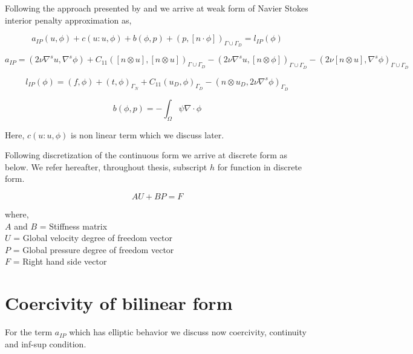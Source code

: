 \documentclass[a4paper,12pt]{book}
\begin{document}
Following the approach presented by \cite{Montlaur} and \cite{Montlaur2} we arrive at weak form of Navier Stokes interior penalty approximation as,

\begin{equation}\label{Navier Stokes weak form}
a_{IP}(u,\phi)+c(u : u, \phi) + b(\phi , p) + ({p},[n \cdot \phi])_{\Gamma \cup \Gamma_D} = l_{IP}(\phi)
\end{equation}

\begin{equation}\label{aIP}
a_{IP} = (2\nu \nabla^s u,\nabla^s \phi) + C_{11}([n \otimes u],[n \otimes u])_{\Gamma \cup \Gamma_D} - (2 \nu {\nabla^s u},[n \otimes \phi])_{\Gamma \cup \Gamma_D} - (2 \nu [n \otimes u], {\nabla^s \phi})_{\Gamma \cup \Gamma_D} 
\end{equation}

\begin{equation}\label{lIP}
l_{IP}(\phi) = (f,\phi) + (t,\phi)_{\Gamma_N} + C_{11}(u_D,\phi)_{\Gamma_D} - (n \otimes u_D, 2 \nu \nabla^s \phi)_{\Gamma_D}
\end{equation}

\begin{equation}\label{b_continuity}
b(\phi,p) = -\int_{\Omega} \psi \nabla \cdot \phi
\end{equation}

Here, $c(u : u, \phi)$ is non linear term which we discuss later.

Following discretization of the continuous form we arrive at discrete form as below. We refer hereafter, throughout thesis, subscript $h$ for function in discrete form.

\begin{equation}\label{Navier Stokes Matrix form}
A U + B P = F
\end{equation}

where,\\
$A$ and $B$ = Stiffness matrix\\
$U$ = Global velocity degree of freedom vector\\
$P$ = Global pressure degree of freedom vector\\
$F$ = Right hand side vector\\

\section{Coercivity of bilinear form} 

For the term $a_{IP}$ which has elliptic behavior we discuss now coercivity, continuity and inf-sup condition\cite{riviere}.
\end{document}
